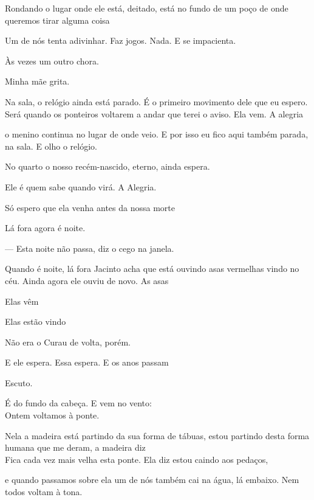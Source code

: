 Rondando o lugar onde ele está, deitado, está no fundo de um poço de
onde queremos tirar alguma coisa

Um de nós tenta adivinhar. Faz jogos. Nada. E se impacienta.

Às vezes um outro chora.

Minha mãe grita.

Na sala, o relógio ainda está parado. É o primeiro movimento dele que eu
espero. Será quando os ponteiros voltarem a andar que terei o aviso. Ela
vem. A alegria

o menino continua no lugar de onde veio. E por isso eu fico aqui também
parada, na sala. E olho o relógio.

No quarto o nosso recém-nascido, eterno, ainda espera.

Ele é quem sabe quando virá. A Alegria.

Só espero que ela venha antes da nossa morte

\pagebreak

\vspace*{4cm}

Lá fora agora é noite.

--- Esta noite não passa, diz o cego na janela.

Quando é noite, lá fora Jacinto acha que está ouvindo asas vermelhas
vindo no céu. Ainda agora ele ouviu de novo. As asas

Elas vêm

Elas estão vindo

Não era o Curau de volta, porém.

E ele espera. Essa espera. E os anos passam

\pagebreak

\clearpage
\thispagestyle{empty}

\movetooddpage

\vspace*{4cm}

Escuto.

É do fundo da cabeça. E vem no vento:\\

Ontem voltamos à ponte.

Nela a madeira está partindo da sua forma de tábuas, estou partindo
desta forma humana que me deram, a madeira diz\\

Fica cada vez mais velha esta ponte. Ela diz estou caindo aos pedaços,

e quando passamos sobre ela um de nós também cai na água, lá embaixo.
Nem todos voltam à tona.

